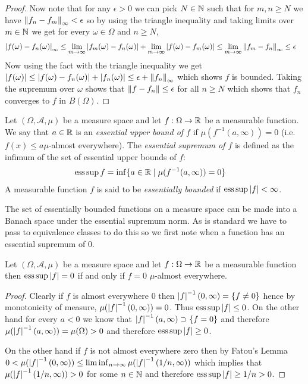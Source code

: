 \begin{proof}
Now note that for any $\epsilon > 0$ we can pick $N \in \mathbb{N}$ such that for $m,n \geq N$ we have $\left \lVert f_n-f_m \right \rVert_\infty < \epsilon$ so by using the triangle inequality and taking limits over $m \in \mathbb{N}$ we get for every $\omega \in \Omega$ and $n \geq N$,
\begin{align*}
\left \vert f (\omega) -f_n(\omega) \right \vert_\infty &\leq \lim_{m \to \infty} \left \vert f_m(\omega) -f_n(\omega) \right \vert + \lim_{m \to \infty} \left \vert f(\omega) -f_m(\omega) \right \vert 
\leq \lim_{m \to \infty} \left \lVert f_m -f_n \right \rVert_\infty \leq \epsilon
\end{align*}
Now using the fact with the triangle inequality we get $\left \vert f(\omega) \right \vert \leq \left \vert f(\omega) - f_n(\omega) \right \vert + \left \vert f_n(\omega) \right \vert \leq \epsilon + \left \lVert f_n \right \rVert_\infty$ which shows $f$ is bounded.  Taking the supremum over $\omega$ shows that $\left \lVert f -f_n \right \rVert \leq \epsilon$ for all $n \geq N$ which shows that $f_n$ converges to $f$ in $B(\Omega)$.
\end{proof}

\begin{defn}Let $(\Omega, \mathcal{A}, \mu)$ be a measure space and let $f : \Omega \to \mathbb{R}$ be a measurable function.  We say that $a \in \mathbb{R}$ is an \emph{essential upper bound of $f$} if $\mu(f^{-1}(a, \infty)) = 0$ (i.e. $f(x) \leq a \mu$-almost everywhere).  The \emph{essential supremum of $f$} is defined as the infimum of the set of essential upper bounds of $f$: 
\begin{align*}
\operatorname*{ess\,sup} f &= \inf \lbrace a \in \mathbb{R} \mid \mu(f^{-1}(a,\infty)) = 0 \rbrace
\end{align*}
A measurable function $f$ is said to be \emph{essentially bounded} if $\operatorname*{ess\,sup} \left \vert f \right \vert < \infty$.
\end{defn}

The set of essentially bounded functions on a measure space can be made into a Banach space under the essential supremum norm.  As is standard we have to pass to equivalence classes to do this so we first note when a function has an essential supremum of $0$.
\begin{prop}Let $(\Omega, \mathcal{A}, \mu)$ be a measure space and let $f : \Omega \to \mathbb{R}$ be a measurable function then $\operatorname*{ess\,sup} \left \vert f \right \vert = 0$ if and only if $f = 0$ $\mu$-almost everywhere.
\end{prop}
\begin{proof}
Clearly if $f$ is almost everywhere $0$ then $\left \vert f \right \vert^{-1}(0, \infty) = \lbrace f \neq 0 \rbrace$ hence by monotonicity of measure, $\mu(\left \vert f \right \vert^{-1}(0,\infty)) = 0$.  Thus $\operatorname*{ess\,sup} \left \vert f \right \vert \leq 0$.  On the other hand for every $a < 0$ we know that $\left \vert f \right \vert^{-1}(a,\infty) \supset \lbrace f = 0 \rbrace$ and therefore $\mu(\left \vert f \right \vert^{-1}(a,\infty)) = \mu(\Omega) > 0$ and therefore $\operatorname*{ess\,sup} \left \vert f \right \vert \geq 0$.  

On the other hand if $f$ is not almost everywhere zero then by Fatou's Lemma $0 < \mu(\left \vert f \right \vert^{-1}(0,\infty)) \leq \liminf_{n \to \infty} \mu(\left \vert f \right \vert^{-1}(1/n, \infty))$ which implies that $\mu(\left \vert f \right \vert^{-1}(1/n, \infty)) > 0$ for some $n \in \mathbb{N}$ and therefore $\operatorname*{ess\,sup} \left \vert f \right \vert \geq 1/n > 0$.
\end{proof}

